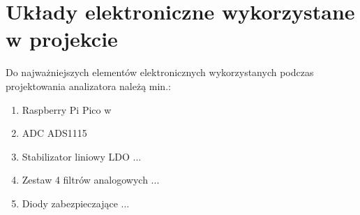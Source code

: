 \section{Układy elektroniczne wykorzystane w projekcie}

Do najważniejszych elementów elektronicznych wykorzystanych 
podczas projektowania analizatora należą min.:
 
\begin{enumerate}
    \item Raspberry Pi Pico w
    \item ADC ADS1115
    \item Stabilizator liniowy LDO ...
    \item Zestaw 4 filtrów analogowych ...  
    \item Diody zabezpieczające ... 
\end{enumerate}

